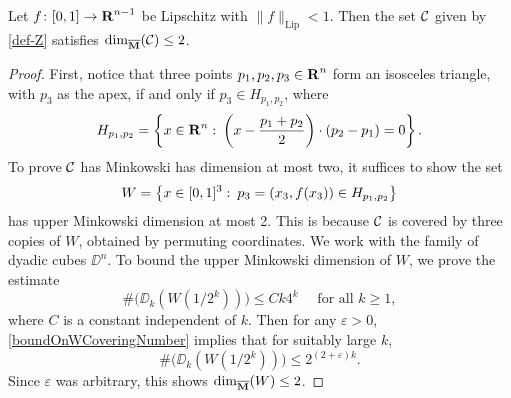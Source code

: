 \begin{lemma}
	Let $f\colon [0,1] \to \operatorname{\mathbf{R}}^{n-1}$ be Lipschitz with $\| f \|_{\text{Lip}} < 1$. Then the set $\operatorname{\mathcal{C}}$ given by \eqref{def-Z} satisfies $\operatorname{\dim_{\overline{\mathbf{M}}}}(\operatorname{\mathcal{C}}) \leq 2$.
\end{lemma}
\begin{proof}
	First, notice that three points $p_1,p_2,p_3 \in \operatorname{\mathbf{R}}^n$ form an isosceles triangle, with $p_3$ as the apex, if and only if $p_3 \in H_{p_1,p_2}$, where
	\begin{equation} \label{def-H}  H_{p_1,p_2} = \left\{ x \in \operatorname{\mathbf{R}}^n \operatorname{\colon} \left( x - \frac{p_1 + p_2}{2} \right) \cdot (p_2 - p_1) = 0 \right\}. \end{equation} 
	To prove $\operatorname{\mathcal{C}}$ has Minkowski has dimension at most two, it suffices to show the set
	\[ W = \left\{ x \in [0,1]^3 \operatorname{\colon} p_3 = (x_3,f(x_3)) \in H_{p_1, p_2} \right\} \]
	has upper Minkowski dimension at most 2. This is because $\operatorname{\mathcal{C}}$ is covered by three copies of $W$, obtained by permuting coordinates. We work with the family of dyadic cubes $\DD^n$. To bound the upper Minkowski dimension of $W$, we prove the estimate
	\begin{equation}\label{boundOnWCoveringNumber}
		\# \bigl(\mathcal \DD_k(W(1/2^k)) \bigr) \leq C k 4^k \quad \text{ for all } k \geq 1,  
	\end{equation}  
	where $C$ is a constant independent of $k$. Then for any $\varepsilon > 0$, \eqref{boundOnWCoveringNumber} implies that for suitably large $k$,
	\[ \# \bigl(\mathcal \DD_k(W(1/2^k)) \bigr) \leq 2^{(2 + \varepsilon)k}. \]
	Since $\varepsilon$ was arbitrary, this shows $\operatorname{\dim_{\overline{\mathbf{M}}}}(W) \leq 2$.


\end{proof}
